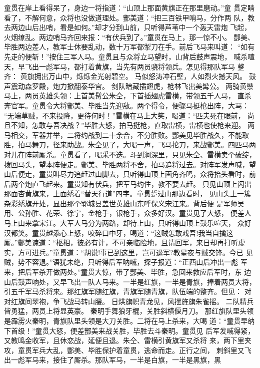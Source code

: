 童贯在岸上看得呆了，身边一将指道：“山顶上那面黄旗正在那里磨动。”童
贯定睛看了，不解何意，众将也没做道理处。酆美道：“把三百铁甲哨马，分作两
队，教去两边山后出哨，看是如何。”却才分到山前，只听得芦苇中一个轰天雷炮
飞起，火烟缭乱。两边哨马齐回来报：“有伏兵到了。”童贯在马上，那一惊不小。
酆美、毕胜两边差人，教军士休要乱动，数十万军都掣刀在手。前后飞马来叫道：
“如有先走的便斩！”按住三军人马。童贯且与众将立马望时，山背后鼓声震地，
喊杀喧天，早飞出一彪军马，都打着黄旗，当先有两员骁将领兵。怎见得那队军马
整齐：
黄旗拥出万山中，烁烁金光射碧空。
马似怒涛冲石壁，人如烈火撼天风。
鼓声震动森罗殿，炮力掀翻泰华宫。
剑队暗藏插翅虎，枪林飞出美髯公。
两骑黄鬃马上，两员英雄头领：上首美髯公朱仝，下首插翅虎雷横，带领五千人马，
直杀奔官军。童贯令大将酆美、毕胜当先迎敌。两个得令，便骤马挺枪出阵，大骂：
“无端草贼，不来投降，更待何时！”雷横在马上大笑，喝道：“匹夫死在眼前，
尚且不知，怎敢与吾决战？”毕胜大怒，拍马挺枪，直取雷横，雷横也使枪来迎。
两马相交，军器并举，二将约战到二十余合，不分胜败。酆美见毕胜战久，不能取
胜，拍马舞刀，径来助战。朱仝见了，大喝一声，飞马抡刀，来战酆美。四匹马两
对儿在阵前厮杀。童贯看了，喝采不迭。斗到涧深里，只见朱仝、雷横卖个破绽，
拨回马头，望本阵便走。酆美、毕胜两将不舍，拍马追将过去。对阵军发声喊，望
山后便走，童贯叫尽力追赶过山脚去，只听得山顶上画角齐鸣，众将抬头看时，前
后两个炮直飞起来。童贯知有伏兵，把军马约住，教不要去赶。
只见山顶上闪出那面杏黄旗来，上面绣着“替天行道”四字。童贯踅过山那边看时，
见山头上一簇杂彩绣旗开处，显出那个郓城县盖世英雄山东呼保义宋江来。背后便
是军师吴用、公孙胜、花荣、徐宁，金枪手，银枪手，众多好汉。童贯见了大怒，
便差人马上山来拿宋江。大军人马分为两路，却待上山，只听得山顶上鼓乐喧天，
众好汉都笑。童贯越添心上怒，咬碎口中牙，喝道：“这贼怎敢戏吾!我当自擒这
厮。”酆美谏道：“枢相，彼必有计，不可亲临险地，且请回军，来日却再打听虚
实，方可进兵。”童贯道：“胡说!事已到这里，岂可退军?教星夜与贼交锋。今已
见贼，势不容退。”语犹未绝，只听得后军呐喊，探子报道：“正西山后冲出一彪
军来，把后军杀开做两处。”童贯大惊，带了酆美、毕胜，急回来救应后军时，东
边山后鼓声响处，又早飞出一队人马来。一半是红旗，一半是青旗，捧着两员大将，
引五千军马杀将来。那红旗军随红旗，青旗军随青旗，队伍端的整齐。但见：
对对红旗间翠袍，争飞战马转山腰。
日烘旗帜青龙见，风摆旌旗朱雀摇。
二队精兵皆勇猛，两员上将显英豪。
秦明手舞狼牙棍，关胜斜横偃月刀。
那红旗队里头领是霹雳火秦明，青旗队里头领是大刀关胜。二将在马上杀来，大喝
道：“童贯早纳下首级！”童贯大怒，便差酆美来战关胜，毕胜去斗秦明。童贯见
后军发喊得紧，又教鸣金收军，且休恋战，延便且退。朱仝、雷横引黄旗军又杀将
来，两下里夹攻，童贯军兵大乱，酆美、毕胜保护着童贯，逃命而走。正行之间，
刺斜里又飞出一彪军马来，接住了厮杀。那队军马，一半是白旗，一半是黑旗，黑
